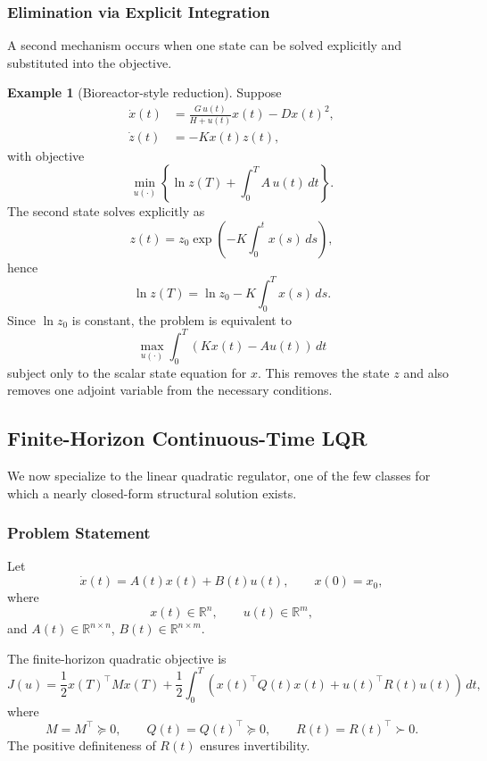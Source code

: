 \documentclass[11pt]{article}
\theoremstyle{definition}
\newtheorem{example}{Example}
\newcommand{\R}{\mathbb{R}}
\begin{document}
\subsubsection{Elimination via Explicit Integration}

A second mechanism occurs when one state can be solved explicitly and substituted into the objective.

\begin{example}[Bioreactor-style reduction]
Suppose
\begin{align}
\dot{x}(t) &= \frac{G\,u(t)}{H+u(t)}x(t)-D x(t)^2,\\
\dot{z}(t) &= -Kx(t)z(t),
\end{align}
with objective
\[
\min_{u(\cdot)} \left\{ \ln z(T) + \int_0^T A\,u(t)\,dt \right\}.
\]
The second state solves explicitly as
\[
z(t)=z_0 \exp\!\left(-K\int_0^t x(s)\,ds\right),
\]
hence
\[
\ln z(T)=\ln z_0 - K\int_0^T x(s)\,ds.
\]
Since $\ln z_0$ is constant, the problem is equivalent to
\[
\max_{u(\cdot)} \int_0^T \left(Kx(t)-A u(t)\right)\,dt
\]
subject only to the scalar state equation for $x$. This removes the state $z$ and also removes one adjoint variable from the necessary conditions.
\end{example}

\subsection{Finite-Horizon Continuous-Time LQR}

We now specialize to the linear quadratic regulator, one of the few classes for which a nearly closed-form structural solution exists.

\subsubsection{Problem Statement}

Let
\begin{equation}
\dot{x}(t)=A(t)x(t)+B(t)u(t), \qquad x(0)=x_0,
\end{equation}
where
\[
x(t)\in\R^n,\qquad u(t)\in\R^m,
\]
and $A(t)\in\R^{n\times n}$, $B(t)\in\R^{n\times m}$.

The finite-horizon quadratic objective is
\begin{equation}
J(u)=\frac{1}{2}x(T)^\top M x(T)+\frac{1}{2}\int_0^T
\left( x(t)^\top Q(t)x(t)+u(t)^\top R(t)u(t)\right)\,dt,
\end{equation}
where
\[
M=M^\top \succeq 0,\qquad Q(t)=Q(t)^\top \succeq 0,\qquad R(t)=R(t)^\top \succ 0.
\]
The positive definiteness of $R(t)$ ensures invertibility.
\end{document}
